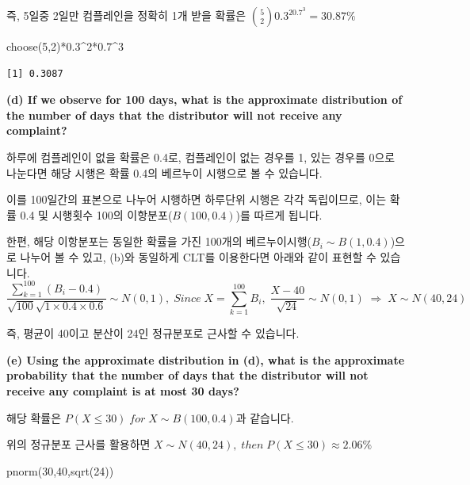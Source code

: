 \documentclass[
  a4paper,
  DIV=11,
  numbers=noendperiod]{scrreprt}
\newenvironment{Shaded}{\begin{snugshade}}{\end{snugshade}}
\newcommand{\DecValTok}[1]{\textcolor[rgb]{0.68,0.00,0.00}{#1}}
\newcommand{\FloatTok}[1]{\textcolor[rgb]{0.68,0.00,0.00}{#1}}
\newcommand{\FunctionTok}[1]{\textcolor[rgb]{0.28,0.35,0.67}{#1}}
\newcommand{\NormalTok}[1]{\textcolor[rgb]{0.00,0.23,0.31}{#1}}
\newcommand{\SpecialCharTok}[1]{\textcolor[rgb]{0.37,0.37,0.37}{#1}}
\begin{document}
즉, 5일중 2일만 컴플레인을 정확히 1개 받을 확률은
\({5\choose2}0.3^20.7^3=30.87\%\)

\begin{Shaded}
\begin{Highlighting}[]
\FunctionTok{choose}\NormalTok{(}\DecValTok{5}\NormalTok{,}\DecValTok{2}\NormalTok{)}\SpecialCharTok{*}\FloatTok{0.3}\SpecialCharTok{\^{}}\DecValTok{2}\SpecialCharTok{*}\FloatTok{0.7}\SpecialCharTok{\^{}}\DecValTok{3}
\end{Highlighting}
\end{Shaded}

\begin{verbatim}
[1] 0.3087
\end{verbatim}

\textbf{(d) If we observe for 100 days, what is the approximate
distribution of the number of days that the distributor will not receive
any complaint?}

하루에 컴플레인이 없을 확률은 0.4로, 컴플레인이 없는 경우를 1, 있는
경우를 0으로 나눈다면 해당 시행은 확률 0.4의 베르누이 시행으로 볼 수
있습니다.

이를 100일간의 표본으로 나누어 시행하면 하루단위 시행은 각각 독립이므로,
이는 확률 0.4 및 시행횟수 100의 이항분포(\(B(100,0.4)\))를 따르게
됩니다.

한편, 해당 이항분포는 동일한 확률을 가진 100개의
베르누이시행(\(B_i\sim B(1,0.4)\))으로 나누어 볼 수 있고, (b)와 동일하게
CLT를 이용한다면 아래와 같이 표현할 수 있습니다.
\[\frac{\sum_{k=1}^{100}(B_i-0.4)}{\sqrt{100}\sqrt{1\times 0.4 \times 0.6}}\sim N(0,1),\;Since\;X=\sum_{k=1}^{100}B_i,\;\frac{X-40}{\sqrt{24}}\sim N(0,1)\;\Rightarrow\;X\sim N(40,24)\]

즉, 평균이 40이고 분산이 24인 정규분포로 근사할 수 있습니다.

\textbf{(e) Using the approximate distribution in (d), what is the
approximate probability that the number of days that the distributor
will not receive any complaint is at most 30 days?}

해당 확률은 \(P(X\leq 30)\;for\;X\sim B(100,0.4)\)과 같습니다.

위의 정규분포 근사를 활용하면
\(X\sim N(40,24),\;then\;P(X\leq 30)\approx 2.06\%\)

\begin{Shaded}
\begin{Highlighting}[]
\FunctionTok{pnorm}\NormalTok{(}\DecValTok{30}\NormalTok{,}\DecValTok{40}\NormalTok{,}\FunctionTok{sqrt}\NormalTok{(}\DecValTok{24}\NormalTok{))}
\end{Highlighting}
\end{Shaded}
\end{document}

